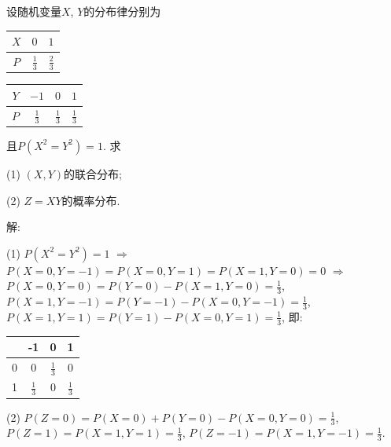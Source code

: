 \documentclass[standard]{ExBook}
\renewenvironment{shaded}{%
  \def\FrameCommand{\fboxsep=\FrameSep \colorbox{shadecolor}}%
  \MakeFramed{\advance\hsize-\width \FrameRestore}%
}{%
  \endMakeFramed
}
\begin{document}
\begin{qitems}
\vspace{2.5cm-5em}

    \begin{bbox}
    \begin{shaded}
        \qitem
设随机变量$X$, $Y$的分布律分别为

\vspace{0.5em}
\renewcommand{\arraystretch}{1.2}
\setlength{\tabcolsep}{2em}
\begin{minipage}[c]{0.39\textwidth}
\centering
\begin{tabular}{c|cc}
    $X$ & $0$ & $1$\\
    \hline
    $P$ & $\displaystyle\frac{1}{3}$ & $\displaystyle\frac{2}{3}$
\end{tabular}
\end{minipage}
\begin{minipage}[c]{0.6\textwidth}
\centering
\begin{tabular}{c|ccc}
    $Y$ & $-1$ & $0$ & $1$\\
    \hline
    $P$ & $\displaystyle\frac{1}{3}$ & $\displaystyle\frac{1}{3}$ & $\displaystyle\frac{1}{3}$
\end{tabular}
\end{minipage}
\vspace{0.2em}

且$P(X^2=Y^2)=1$. 求

(1) $(X,Y)$的联合分布;

(2) $Z=XY$的概率分布.
    \end{shaded}
    \end{bbox}

\vspace{\dimexpr2.5cm-5em\relax}

解: 

(1) $P(X^2=Y^2)=1$ $\Longrightarrow$ $P(X=0,Y=-1)=P(X=0,Y=1)=P(X=1,Y=0)=0$ $\Longrightarrow$ $P(X=0,Y=0)=P(Y=0)-P(X=1,Y=0)=\frac{1}{3}$, $P(X=1,Y=-1)=P(Y=-1)-P(X=0,Y=-1)=\frac{1}{3}$, $P(X=1,Y=1)=P(Y=1)-P(X=0,Y=1)=\frac{1}{3}$, 即:

\begin{center}
    \renewcommand{\arraystretch}{1.4}
    \setlength{\tabcolsep}{12pt}
    \begin{tabular}{c|c|c|c}
	    \hline
	    \diagbox{$X$}{$P(X,Y)$}{$Y$} & -1 & 0 & 1\\
	    \hline
	    0 & 0 & $\displaystyle\frac{1}{3}$ & 0\\
	    \hline
	    1 & $\displaystyle\frac{1}{3}$ & 0 & $\displaystyle\frac{1}{3}$\\
	    \hline
    \end{tabular}
\end{center}
(2) $P(Z=0)=P(X=0)+P(Y=0)-P(X=0,Y=0)=\displaystyle\frac{1}{3}$, $P(Z=1)=P(X=1,Y=1)=\displaystyle\frac{1}{3}$, $P(Z=-1)=P(X=1,Y=-1)=\displaystyle\frac{1}{3}$.


\end{qitems}
\end{document}
